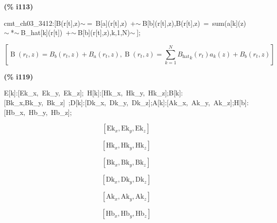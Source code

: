 \documentclass[fleqn]{article}
\begin{document}
\noindent
\begin{minipage}[t]{4.000000em}\color{red}\bfseries
(\% i113)	
\end{minipage}
\begin{minipage}[t]{\textwidth}\color{blue}
cmt\_ch03\_3412:[B(r[t],z)\ensuremath{\sim\ }=\ B[a](r[t],z)\ +\ensuremath{\sim\ }B[b](r[t],z),B(r[t],z)\ =\ sum(a[k](z)\ensuremath{\sim\ }*\ensuremath{\sim\ }B\_hat[k](r[t])\ +\ensuremath{\sim\ }B[b](r[t],z),k,1,N)\ensuremath{\sim\ }];
\end{minipage}
\[\displaystyle \tag{cmt\_ ch03\_ 3412} 
\left[ \operatorname{B}\left( {r_t}\operatorname{,}z\right) ={B_b}\left( {r_t}\operatorname{,}z\right) +{B_a}\left( {r_t}\operatorname{,}z\right) \operatorname{,}\operatorname{B}\left( {r_t}\operatorname{,}z\right) =\sum_{k=1}^{N}{\left. {{{B_{\ensuremath{\mathrm{hat}}}}}_k}\left( {r_t}\right)  {a_k}(z)+{B_b}\left( {r_t}\operatorname{,}z\right) \right.}\right] \mbox{}
\]


\noindent
\begin{minipage}[t]{4.000000em}\color{red}\bfseries
(\% i119)	
\end{minipage}
\begin{minipage}[t]{\textwidth}\color{blue}
E[k]:[Ek\_x,\ Ek\_y,\ Ek\_z];\ H[k]:[Hk\_x,\ Hk\_y,\ Hk\_z];B[k]:[Bk\_x,Bk\_y,\ Bk\_z]\ ;D[k]:[Dk\_x,\ Dk\_y,\ Dk\_z];A[k]:[Ak\_x,\ Ak\_y,\ Ak\_z];H[b]:[Hb\_x,\ Hb\_y,\ Hb\_z];
\end{minipage}
\[\displaystyle \tag{E[k]} 
\left[ {{\ensuremath{\mathrm{Ek}}}_x}\operatorname{,}{{\ensuremath{\mathrm{Ek}}}_y}\operatorname{,}{{\ensuremath{\mathrm{Ek}}}_z}\right] \mbox{}\]

\[\tag{H[k]} 
\left[ {{\ensuremath{\mathrm{Hk}}}_x}\operatorname{,}{{\ensuremath{\mathrm{Hk}}}_y}\operatorname{,}{{\ensuremath{\mathrm{Hk}}}_z}\right] \mbox{}\]

\[\tag{B[k]} 
\left[ {{\ensuremath{\mathrm{Bk}}}_x}\operatorname{,}{{\ensuremath{\mathrm{Bk}}}_y}\operatorname{,}{{\ensuremath{\mathrm{Bk}}}_z}\right] \mbox{}\]

\[\tag{D[k]} 
\left[ {{\ensuremath{\mathrm{Dk}}}_x}\operatorname{,}{{\ensuremath{\mathrm{Dk}}}_y}\operatorname{,}{{\ensuremath{\mathrm{Dk}}}_z}\right] \mbox{}\]

\[\tag{A[k]} 
\left[ {{\ensuremath{\mathrm{Ak}}}_x}\operatorname{,}{{\ensuremath{\mathrm{Ak}}}_y}\operatorname{,}{{\ensuremath{\mathrm{Ak}}}_z}\right] \mbox{}\]

\[\tag{H[b]} 
\left[ {{\ensuremath{\mathrm{Hb}}}_x}\operatorname{,}{{\ensuremath{\mathrm{Hb}}}_y}\operatorname{,}{{\ensuremath{\mathrm{Hb}}}_z}\right] \mbox{}
\]
\end{document}
